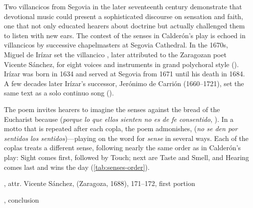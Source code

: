 Two villancicos from Segovia in the later seventeenth century demonstrate that
devotional music could present a sophisticated discourse on sensation and faith,
one that not only educated hearers about doctrine but actually challenged them
to listen with new ears.  
The contest of the senses in Calderón's play is echoed in villancicos by
successive chapelmasters at Segovia Cathedral.
In the 1670s, Miguel de Irízar set the villancico , later attributed to the Zaragozan poet Vicente Sánchez,
for eight voices and instruments in grand polychoral style ().%
    \Autocite{LopezCalo:Segovia}
Irízar was born in 1634 and served at Segovia from 1671 until his death in 1684.
A few decades later Irízar's successor, Jerónimo de Carrión (1660--1721), set
the same text as a solo continuo song ().%
    \Autocite[133--152]{Cashner:WLSCM32}

The poem invites hearers to imagine the senses 
against the bread of the Eucharist because  (\emph{porque lo que ellos sienten no es de fe consentido},
).%
    \Autocite[171--172]{Sanchez:LiraPoetica}
In a motto that is repeated after each copla, the poem admonishes,  (\emph{no se den por sentidos los sentidos})---playing
on the word for \emph{sense} in several ways.  
Each of the coplas treats a different sense, following nearly the same order as
in Calderón's play: Sight comes first, followed by Touch; next are Taste and
Smell, and Hearing comes last and wins the day (\cref{tab:senses-order}).

\begin{poemexample}
    \caption{, attr. Vicente
    Sánchez,  (Zaragoza, 1688), 171--172, first portion}
    
    \label{poem:Si_los_sentidos-Sanchez-1}
\end{poemexample}

\begin{poemexample}
    \caption{, conclusion}

    \label{poem:Si_los_sentidos-Sanchez-2}
\end{poemexample}


